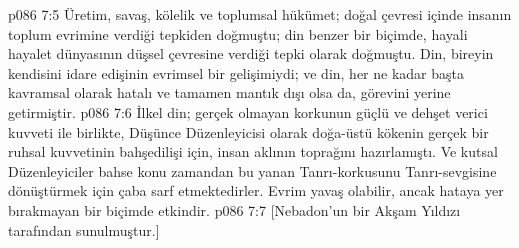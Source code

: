 \vs p086 7:5 Üretim, savaş, kölelik ve toplumsal hükümet; doğal çevresi içinde insanın toplum evrimine verdiği tepkiden doğmuştu; din benzer bir biçimde, hayali hayalet dünyasının düşsel çevresine verdiği tepki olarak doğmuştu. Din, bireyin kendisini idare edişinin evrimsel bir gelişimiydi; ve din, her ne kadar başta kavramsal olarak hatalı ve tamamen mantık dışı olsa da, görevini yerine getirmiştir.
\vs p086 7:6 İlkel din; gerçek olmayan korkunun güçlü ve dehşet verici kuvveti ile birlikte, Düşünce Düzenleyicisi olarak doğa\hyp{}üstü kökenin gerçek bir ruhsal kuvvetinin bahşedilişi için, insan aklının toprağını hazırlamıştı. Ve kutsal Düzenleyiciler bahse konu zamandan bu yanan Tanrı\hyp{}korkusunu Tanrı\hyp{}sevgisine dönüştürmek için çaba sarf etmektedirler. Evrim yavaş olabilir, ancak hataya yer bırakmayan bir biçimde etkindir.
\vs p086 7:7 [Nebadon’un bir Akşam Yıldızı tarafından sunulmuştur.]
